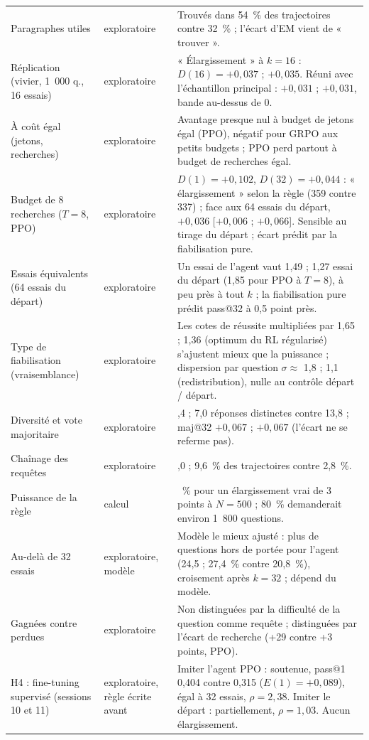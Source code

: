 \begin{table}[h]
\begin{tabular}{>{\raggedright\arraybackslash}p{3.6cm}>{\raggedright\arraybackslash}p{1.9cm}>{\raggedright\arraybackslash}p{8.6cm}}
Paragraphes utiles & exploratoire & Trouvés dans 54~\% des trajectoires contre 32~\% ; l'écart d'EM vient de « trouver ». \\
Réplication (vivier, 1~000 q., 16 essais) & exploratoire & « Élargissement » à $k = 16$ : $D(16) = +0{,}037$ ; $+0{,}035$. Réuni avec l'échantillon principal : $+0{,}031$ ; $+0{,}031$, bande au-dessus de 0. \\
À coût égal (jetons, recherches) & exploratoire & Avantage presque nul à budget de jetons égal (PPO), négatif pour GRPO aux petits budgets ; PPO perd partout à budget de recherches égal. \\
Budget de 8 recherches ($T = 8$, PPO) & exploratoire & $D(1) = +0{,}102$, $D(32) = +0{,}044$ : « élargissement » selon la règle (359 contre 337) ; face aux 64 essais du départ, $+0{,}036$ [$+0{,}006$ ; $+0{,}066$]. Sensible au tirage du départ ; écart prédit par la fiabilisation pure. \\
Essais équivalents (64 essais du départ) & exploratoire & Un essai de l'agent vaut 1,49 ; 1,27 essai du départ (1,85 pour PPO à $T = 8$), à peu près à tout $k$ ; la fiabilisation pure prédit pass@32 à 0,5 point près. \\
Type de fiabilisation (vraisemblance) & exploratoire & Les cotes de réussite multipliées par 1,65 ; 1,36 (optimum du RL régularisé) s'ajustent mieux que la puissance ; dispersion par question $\sigma \approx$ 1,8 ; 1,1 (redistribution), nulle au contrôle départ / départ. \\
Diversité et vote majoritaire & exploratoire & 5,4 ; 7,0 réponses distinctes contre 13,8 ; maj@32 $+0{,}067$ ; $+0{,}067$ (l'écart ne se referme pas). \\
Chaînage des requêtes & exploratoire & 19,0 ; 9,6~\% des trajectoires contre 2,8~\%. \\
Puissance de la règle & calcul & 25~\% pour un élargissement vrai de 3 points à $N = 500$ ; 80~\% demanderait environ 1~800 questions. \\
Au-delà de 32 essais & exploratoire, modèle & Modèle le mieux ajusté : plus de questions hors de portée pour l'agent (24,5 ; 27,4~\% contre 20,8~\%), croisement après $k = 32$ ; dépend du modèle. \\
Gagnées contre perdues & exploratoire & Non distinguées par la difficulté de la question comme requête ; distinguées par l'écart de recherche (+29 contre +3 points, PPO). \\
H4 : fine-tuning supervisé (sessions 10 et 11) & exploratoire, règle écrite avant & Imiter l'agent PPO : soutenue, pass@1 0,404 contre 0,315 ($E(1) = +0{,}089$), égal à 32 essais, $\rho = 2{,}38$. Imiter le départ : partiellement, $\rho = 1{,}03$. Aucun élargissement. \\

\end{tabular}
\end{table}
